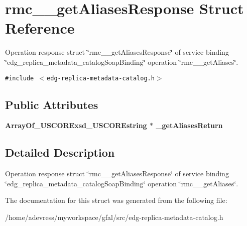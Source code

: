 \section{rmc\_\-\_\-get\-Aliases\-Response Struct Reference}
\label{structrmc____getAliasesResponse}
Operation response struct \char`\"{}rmc\_\-\_\-get\-Aliases\-Response\char`\"{} of service binding \char`\"{}edg\_\-replica\_\-metadata\_\-catalog\-Soap\-Binding\char`\"{} operation \char`\"{}rmc\_\-\_\-get\-Aliases\char`\"{}.  


{\tt \#include $<$edg-replica-metadata-catalog.h$>$}

\subsection*{Public Attributes}
\begin{CompactItemize}
\item 
\bf{Array\-Of\_\-USCORExsd\_\-USCOREstring} $\ast$ \textbf{\_\-get\-Aliases\-Return}\label{structrmc____getAliasesResponse_5e4e17db0239d44b0b3541c2a4c6c350}

\end{CompactItemize}


\subsection{Detailed Description}
Operation response struct \char`\"{}rmc\_\-\_\-get\-Aliases\-Response\char`\"{} of service binding \char`\"{}edg\_\-replica\_\-metadata\_\-catalog\-Soap\-Binding\char`\"{} operation \char`\"{}rmc\_\-\_\-get\-Aliases\char`\"{}. 



The documentation for this struct was generated from the following file:\begin{CompactItemize}
\item 
/home/adevress/myworkspace/gfal/src/edg-replica-metadata-catalog.h\end{CompactItemize}

